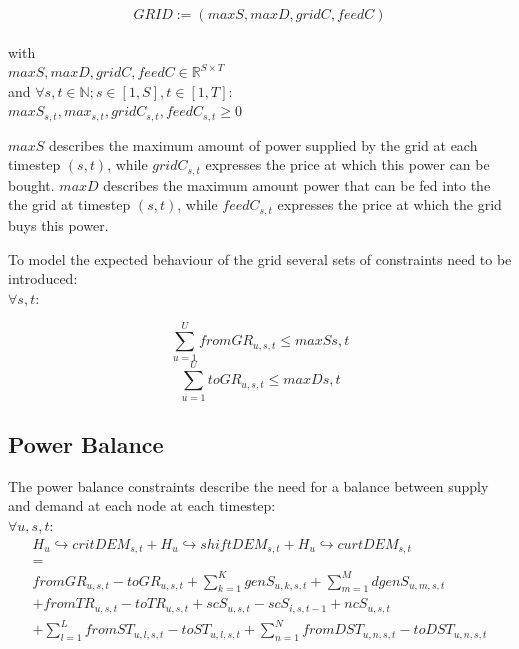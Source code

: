 \documentclass[
	11pt,								%
	DIV10,								%
	a4paper,         					%
	oneside,							%
	headheight=20pt,					%
	footheight=20pt,					%
    parskip=full,						%
    listof=totoc,						%
	bibliography=totoc,					%
	index=totoc,						%
]{scrartcl}
\begin{document}
\begin{equation}
	GRID:= (maxS, maxD, gridC, feedC)
\end{equation}\\
with\\
$maxS,maxD, gridC, feedC \in \mathbb{R}^{S \times T}$\\
and $\forall s,t \in \mathbb{N};s \in [1,S], t \in [1,T]$: \\
$maxS_{s,t}, max_{s,t}, gridC_{s,t}, feedC_{s,t} \geq 0$

$maxS$ describes the maximum amount of power supplied by the grid at each timestep $(s,t)$, while $gridC_{s,t}$ expresses the price at which this power can be bought.
$maxD$ describes the maximum amount power that can be fed into the the grid at timestep $(s,t)$, while $feedC_{s,t}$ expresses the price at which the grid buys this power. 

To model the expected behaviour of the grid several sets of constraints need to be introduced:
\\
$\forall s,t$:

\begin{equation}
	\sum_{u=1}^{U}fromGR_{u,s,t} \leq maxS{s,t}
\end{equation}
\begin{equation}
	\sum_{u=1}^{U}toGR_{u,s,t} \leq maxD{s,t}
\end{equation}


\subsection{Power Balance}
The power balance constraints describe the need for a balance between supply and demand at each node at each timestep: \\

$\forall u,s,t$:
\begin{equation}
	\begin{split}
		H_u\hookrightarrow  critDEM_{s,t} + H_u\hookrightarrow  shiftDEM_{s,t} + H_u\hookrightarrow  curtDEM_{s,t}\\
		= \\
		fromGR_{u,s,t} - toGR_{u,s,t} + \sum_{k=1}^K{genS_{u,k,s,t}} + \sum_{m=1}^M{dgenS_{u,m,s,t}} \\ 
		+ fromTR_{u,s,t} - toTR_{u,s,t} + scS_{u,s,t} - scS_{i,s,t-1} + ncS_{u,s,t} \\
		+ \sum_{l=1}^L{fromST_{u,l,s,t} - toST_{u,l,s,t}} + \sum_{n=1}^N{fromDST_{u,n,s,t}-toDST_{u,n,s,t}}
	\end{split}
\end{equation}
\end{document}

